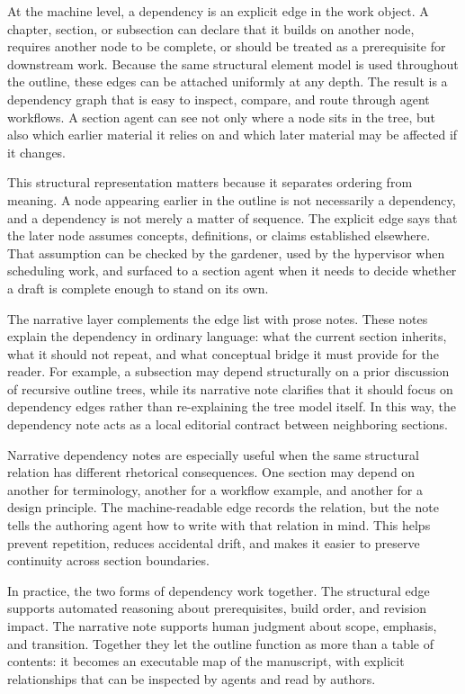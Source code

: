 \documentclass[11pt]{article}
\begin{document}
At the machine level, a dependency is an explicit edge in the work object. A chapter, section, or subsection can declare that it builds on another node, requires another node to be complete, or should be treated as a prerequisite for downstream work. Because the same structural element model is used throughout the outline, these edges can be attached uniformly at any depth. The result is a dependency graph that is easy to inspect, compare, and route through agent workflows. A section agent can see not only where a node sits in the tree, but also which earlier material it relies on and which later material may be affected if it changes.

This structural representation matters because it separates ordering from meaning. A node appearing earlier in the outline is not necessarily a dependency, and a dependency is not merely a matter of sequence. The explicit edge says that the later node assumes concepts, definitions, or claims established elsewhere. That assumption can be checked by the gardener, used by the hypervisor when scheduling work, and surfaced to a section agent when it needs to decide whether a draft is complete enough to stand on its own.

The narrative layer complements the edge list with prose notes. These notes explain the dependency in ordinary language: what the current section inherits, what it should not repeat, and what conceptual bridge it must provide for the reader. For example, a subsection may depend structurally on a prior discussion of recursive outline trees, while its narrative note clarifies that it should focus on dependency edges rather than re-explaining the tree model itself. In this way, the dependency note acts as a local editorial contract between neighboring sections.

Narrative dependency notes are especially useful when the same structural relation has different rhetorical consequences. One section may depend on another for terminology, another for a workflow example, and another for a design principle. The machine-readable edge records the relation, but the note tells the authoring agent how to write with that relation in mind. This helps prevent repetition, reduces accidental drift, and makes it easier to preserve continuity across section boundaries.

In practice, the two forms of dependency work together. The structural edge supports automated reasoning about prerequisites, build order, and revision impact. The narrative note supports human judgment about scope, emphasis, and transition. Together they let the outline function as more than a table of contents: it becomes an executable map of the manuscript, with explicit relationships that can be inspected by agents and read by authors.
\end{document}
